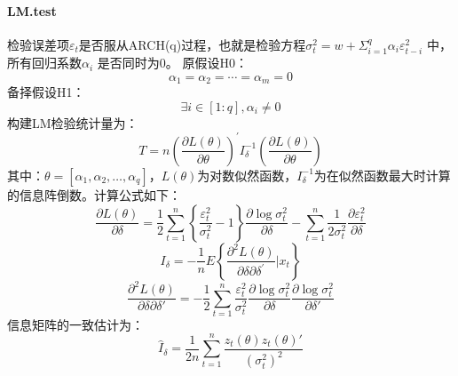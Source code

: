             \paragraph{LM.test}
            检验误差项$\varepsilon_t$是否服从ARCH(q)过程，也就是检验方程$\sigma_t^2=w+\Sigma_{i=1}^q{\alpha_i \varepsilon_{t-i}^2 }$ 中，所有回归系数$\alpha_i$ 是否同时为0。
            原假设H0：
            \[{\alpha _1} = {\alpha _2} = \cdots = {\alpha _m} = 0\]
            备择假设H1：
            \[\exists i \in [1:q],{\alpha _i} \ne 0\]
            构建LM检验统计量为：
            \[T = n\left(\frac{\partial L\left( \theta  \right)}{\partial \theta } \right)^{'}{I_\delta ^{-1}}{\left(\frac{\partial L\left( \theta  \right)}{\partial \theta } \right)}\]
            其中：$\theta=[\alpha_1,\alpha_2,…,\alpha_q]，L(\theta)$为对数似然函数，$I_\delta^{-1}$为在似然函数最大时计算的信息阵倒数。计算公式如下：
            \[\frac{{\partial L\left( \theta  \right)}}{{\partial \delta }} = \frac{1}{2}\sum\limits_{t = 1}^n {\left\{ {\frac{{\varepsilon _t^2}}{{\sigma _t^2}} - 1} \right\}} \frac{{\partial \log \sigma _t^2}}{{\partial \delta }} - \sum\limits_{t = 1}^n {\frac{1}{{2\sigma _t^2}}} \frac{{\partial \varepsilon _t^2}}{{\partial \delta }}\]
            \begin{equation*}
            I_\delta  =  {{- \frac1n}E\left\{ {\frac{\partial ^2L\left( \theta  \right)}{\partial \delta \partial \delta ^{'}}}{\bigg|x_t} \right\} }
            \end{equation*}
            \begin{equation*}
            {\frac{\partial ^2L\left( \theta  \right)}{\partial \delta \partial \delta {'}}} = { - \frac12{\sum\limits_{t = 1}^n } {\frac{\varepsilon _t^2}{\sigma _t^2}}} {\frac{\partial \log \sigma _t^2}{\partial \delta }}{\frac{\partial \log \sigma _t^2}{\partial \delta '}}
            \end{equation*}
            信息矩阵的一致估计为：
            \begin{equation*}
            {\hat I_\delta } ={ \frac{1}{2n}\sum\limits_{t = 1}^n }{\frac{z_t\left( \theta  \right)z_t\left( \theta  \right)'}{{\left( \sigma _t^2 \right)}^2}}
            \end{equation*}
